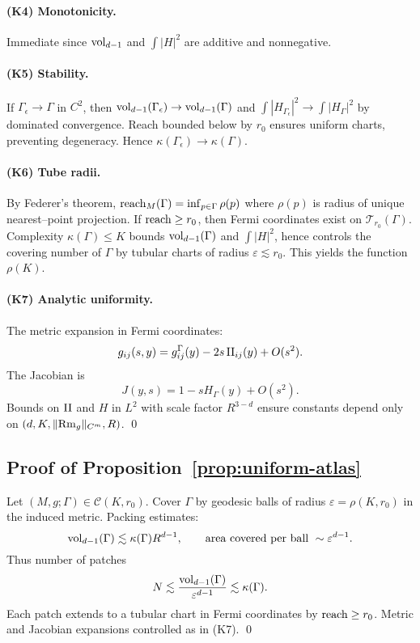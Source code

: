 \paragraph{(K4) Monotonicity.}
Immediate since $\operatorname{vol}_{d-1}$ and $\int |H|^2$ are additive and nonnegative.

\paragraph{(K5) Stability.}
If $\Gamma_\epsilon\to\Gamma$ in $C^2$, then $\operatorname{vol}_{d-1}(\Gamma_\epsilon)\to\operatorname{vol}_{d-1}(\Gamma)$ and
$\int |H_{\Gamma_\epsilon}|^2\to\int |H_\Gamma|^2$ by dominated convergence. Reach bounded below by $r_0$ ensures uniform charts, preventing degeneracy. Hence $\kappa(\Gamma_\epsilon)\to\kappa(\Gamma)$.

\paragraph{(K6) Tube radii.}
By Federer’s theorem, $\operatorname{reach}_M(\Gamma)=\inf_{p\in\Gamma}\rho(p)$ where $\rho(p)$ is radius of unique nearest–point projection. If $\operatorname{reach}\ge r_0$, then Fermi coordinates exist on $\mathcal{T}_{r_0}(\Gamma)$. Complexity $\kappa(\Gamma)\le K$ bounds $\operatorname{vol}_{d-1}(\Gamma)$ and $\int |H|^2$, hence controls the covering number of $\Gamma$ by tubular charts of radius $\varepsilon\lesssim r_0$. This yields the function $\rho(K)$.

\paragraph{(K7) Analytic uniformity.}
The metric expansion in Fermi coordinates:
\[
g_{ij}(s,y)=g^\Gamma_{ij}(y)-2s\,\mathrm{II}_{ij}(y)+O(s^2).
\]
The Jacobian is
\[
J(y,s)=1-sH_\Gamma(y)+O(s^2).
\]
Bounds on $\mathrm{II}$ and $H$ in $L^2$ with scale factor $R^{3-d}$ ensure constants depend only on $(d,K,\|{\rm Rm}_g\|_{C^m},R)$.
\qed

\subsection{Proof of Proposition~\ref{prop:uniform-atlas}}

Let $(M,g;\Gamma)\in\mathcal{C}(K,r_0)$. Cover $\Gamma$ by geodesic balls of radius $\varepsilon=\rho(K,r_0)$ in the induced metric.
Packing estimates:
\[
\operatorname{vol}_{d-1}(\Gamma)\lesssim \kappa(\Gamma)R^{d-1},\qquad \text{area covered per ball }\sim \varepsilon^{d-1}.
\]
Thus number of patches
\[
N\lesssim \frac{\operatorname{vol}_{d-1}(\Gamma)}{\varepsilon^{d-1}}\lesssim \kappa(\Gamma).
\]
Each patch extends to a tubular chart in Fermi coordinates by $\operatorname{reach}\ge r_0$. Metric and Jacobian expansions controlled as in (K7).
\qed

